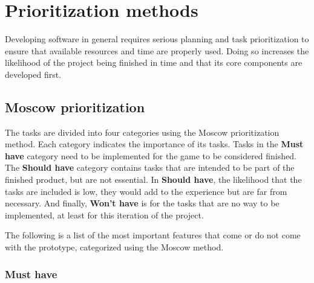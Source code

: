 \section{Prioritization methods}

Developing software in general requires serious planning and task prioritization to ensure that available resources and time are properly used. Doing so increases the likelihood of the project being finished in time and that its core components are developed first.



\subsection{Moscow prioritization} \label{section:Moscow}

The tasks are divided into four categories using the Moscow prioritization method. Each category indicates the importance of its tasks. Tasks in the \textbf{Must have} category need to be implemented for the game to be considered finished. The \textbf{Should have} category contains tasks that are intended to be part of the finished product, but are not essential. In \textbf{Should have}, the likelihood that the tasks are included is low, they would add to the experience but are far from necessary. And finally, \textbf{Won't have} is for the tasks that are no way to be implemented, at least for this iteration of the project.

The following is a list of the most important features that come or do not come with the prototype, categorized using the Moscow method.

\subsubsection{Must have}

